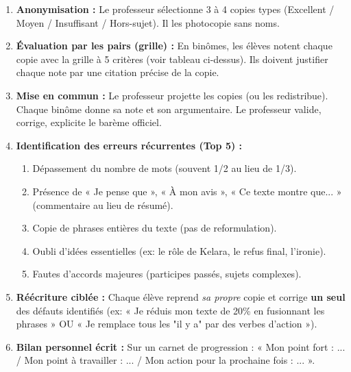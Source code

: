 \documentclass[11pt]{article}
\begin{document}
\begin{methode}
\begin{enumerate}
    \item \textbf{Anonymisation :} Le professeur sélectionne 3 à 4 copies types (Excellent / Moyen / Insuffisant / Hors-sujet). Il les photocopie sans noms.
    \item \textbf{Évaluation par les pairs (grille) :} En binômes, les élèves notent chaque copie avec la grille à 5 critères (voir tableau ci-dessus). Ils doivent justifier chaque note par une citation précise de la copie.
    \item \textbf{Mise en commun :} Le professeur projette les copies (ou les redistribue). Chaque binôme donne sa note et son argumentaire. Le professeur valide, corrige, explicite le barème officiel.
    \item \textbf{Identification des erreurs récurrentes (Top 5) :}
    \begin{enumerate}
        \item Dépassement du nombre de mots (souvent 1/2 au lieu de 1/3).
        \item Présence de « Je pense que », « À mon avis », « Ce texte montre que... » (commentaire au lieu de résumé).
        \item Copie de phrases entières du texte (pas de reformulation).
        \item Oubli d'idées essentielles (ex: le rôle de Kelara, le refus final, l'ironie).
        \item Fautes d'accords majeures (participes passés, sujets complexes).
    \end{enumerate}
    \item \textbf{Réécriture ciblée :} Chaque élève reprend \emph{sa propre} copie et corrige \textbf{un seul} des défauts identifiés (ex: « Je réduis mon texte de 20\% en fusionnant les phrases » OU « Je remplace tous les "il y a" par des verbes d'action »).
    \item \textbf{Bilan personnel écrit :} Sur un carnet de progression : « Mon point fort : ... / Mon point à travailler : ... / Mon action pour la prochaine fois : ... ».
\end{enumerate}
\end{methode}
\end{document}
